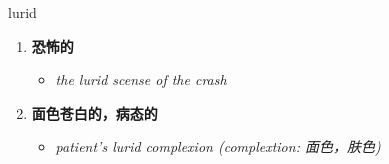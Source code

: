 
\begin{frame}
{\huge lurid}
\begin{center}
\begin{enumerate}\Large
  \item \textbf{恐怖的}
  \begin{itemize}
    \item \em{\Large{the lurid scense of the crash}}
  \end{itemize}
  \item \textbf{面色苍白的，病态的}
  \begin{itemize}
    \item \em{\Large{patient's lurid complexion (complextion: 面色，肤色)}}
  \end{itemize}
\end{enumerate}
\end{center}
\end{frame}
